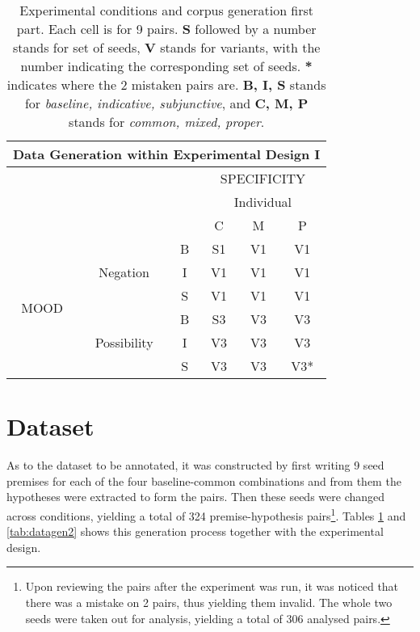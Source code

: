 \begin{table}[h!]
\centering
\begin{tabular}{|c|c|c|c|c|c|}
\hline
\multicolumn{6}{|c|}{Data Generation within Experimental Design I}\\\hline
                      & & &\multicolumn{3}{c|}{SPECIFICITY} \\\cline{4-6} 
                      & & & \multicolumn{3}{c|}{Individual}\\\cline{4-6} 
                      & & & C & M & P\\\hline 
\multirow{6}{*}{MOOD} & \multirow{3}{*}{Negation} & B & S1 & V1 &V1\\\cline{3-6}
                      &                           & I & V1 & V1 &V1\\\cline{3-6}
                      &                           & S & V1  &V1 &V1\\ \cline{2-6}\cline{2-6}                     
                      &\multirow{3}{*}{Possibility}& B & S3 &V3& V3 \\\cline{3-6}
                      &                           & I & V3 & V3 & V3\\\cline{3-6}
                      &                           & S & V3 & V3 & V3*\\\hline                                                          
\end{tabular}
\caption[Experimental conditions and corpus generation I.]{Experimental conditions and corpus generation first part. Each cell is for 9 pairs. \textbf{S} followed by a number stands for set of seeds, \textbf{V} stands for variants, with the number indicating the corresponding set of seeds. \textbf{*} indicates where the 2 mistaken pairs are. \textbf{B, I, S} stands for \textit{baseline, indicative, subjunctive}, and \textbf{C, M, P} stands for \textit{common, mixed, proper}.}
\label{tab:datagen1}
\end{table}

\section{Dataset}
As to the dataset to be annotated, it was constructed by first writing 9 seed premises for each of the four baseline-common combinations and from them the hypotheses were extracted to form the pairs. Then these seeds were changed across conditions, yielding a total of 324 premise-hypothesis pairs\footnote{Upon reviewing the pairs after the experiment was run, it was noticed that there was a mistake on 2 pairs, thus yielding them invalid. The whole two seeds were taken out for analysis, yielding a total of 306 analysed pairs.}. Tables \ref{tab:datagen1} and \ref{tab:datagen2} shows this generation process together with the experimental design.\\

